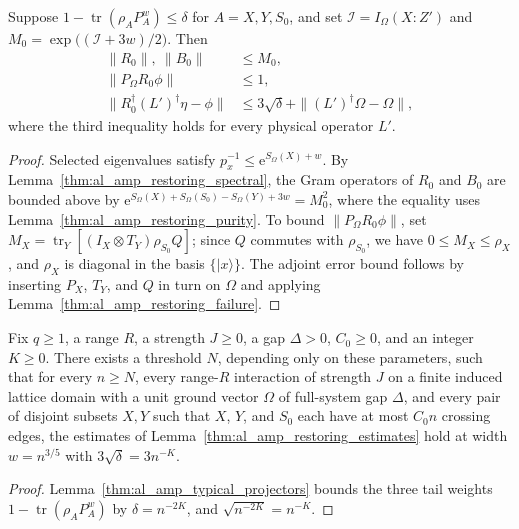 \begin{lemma}
    \label{thm:al_amp_restoring_estimates}
    \leanok
    Suppose $1-\operatorname{tr}(\rho_AP_A^w)\le\delta$ for $A=X,Y,S_0$, and
    set $\mathcal I=I_\Omega(X:Z')$ and
    $M_0=\exp\bigl((\mathcal I+3w)/2\bigr)$. Then
    \begin{align*}
        \|R_0\|,\ \|B_0\|                    & \le M_0, \\
        \|P_\Omega R_0\phi\|                 & \le1,    \\
        \|R_0^\dagger(L')^\dagger\eta-\phi\| & \le
        3\sqrt\delta+\|(L')^\dagger\Omega-\Omega\|,
    \end{align*}
    where the third inequality holds for every physical operator $L'$.
\end{lemma}
\begin{proof}\leanok
    Selected eigenvalues satisfy $p_x^{-1}\le\mathrm e^{S_\Omega(X)+w}$. By
    Lemma~\ref{thm:al_amp_restoring_spectral}, the Gram
    operators of $R_0$ and $B_0$ are bounded above by
    $\mathrm e^{S_\Omega(X)+S_\Omega(S_0)-S_\Omega(Y)+3w}=M_0^2$, where the
    equality uses Lemma~\ref{thm:al_amp_restoring_purity}. To bound
    $\|P_\Omega R_0\phi\|$, set
    $M_X=\operatorname{tr}_Y[(I_X\otimes T_Y)\rho_{S_0}Q]$; since $Q$ commutes
    with $\rho_{S_0}$, we have $0\le M_X\le\rho_X$, and $\rho_X$ is diagonal in
    the basis $\{|x\rangle\}$. The adjoint error bound follows by inserting
    $P_X$, $T_Y$, and $Q$ in turn on $\Omega$ and applying
    Lemma~\ref{thm:al_amp_restoring_failure}.
\end{proof}

\begin{lemma}
    \label{thm:al_amp_restoring_large_scales}
    \leanok
    Fix $q\ge1$, a range $R$, a strength $J\ge0$, a gap $\Delta>0$, $C_0\ge0$,
    and an integer $K\ge0$. There exists a threshold $N$, depending only on these
    parameters, such that for every $n\ge N$, every
    range-$R$ interaction of strength $J$ on a finite induced lattice domain
    with a unit ground vector $\Omega$ of full-system gap $\Delta$, and every
    pair of disjoint subsets $X,Y$ such that $X$, $Y$, and $S_0$ each have at
    most $C_0n$ crossing edges, the estimates of
    Lemma~\ref{thm:al_amp_restoring_estimates} hold at width $w=n^{3/5}$ with
    $3\sqrt\delta=3n^{-K}$.
\end{lemma}
\begin{proof}\leanok
    Lemma~\ref{thm:al_amp_typical_projectors} bounds the three tail weights
    $1-\operatorname{tr}(\rho_AP_A^w)$ by $\delta=n^{-2K}$, and
    $\sqrt{n^{-2K}}=n^{-K}$.
\end{proof}
